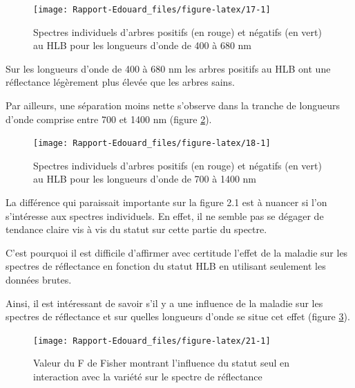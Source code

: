 \documentclass[
  11pt,
  french,
  a4paper,
  extrafontsizes,onecolumn,openright
  ]{memoir}
\begin{document}
\scriptsize

\begin{figure}

{\centering \texttt{[image: Rapport-Edouard\_files/figure-latex/17-1]} 

}

\caption{Spectres individuels d’arbres positifs (en rouge) et négatifs (en vert) au HLB pour les longueurs d'onde de 400 à 680 nm}\label{fig:17}
\end{figure}

\normalsize

Sur les longueurs d'onde de 400 à 680 nm les arbres positifs au HLB ont une réflectance légèrement plus élevée que les arbres sains.

Par ailleurs, une séparation moins nette s'observe dans la tranche de longueurs d'onde comprise entre 700 et 1400 nm (figure \ref{fig:18}).

\scriptsize

\begin{figure}

{\centering \texttt{[image: Rapport-Edouard\_files/figure-latex/18-1]} 

}

\caption{Spectres individuels d’arbres positifs (en rouge) et négatifs (en vert) au HLB pour les longueurs d’onde de 700 à 1400 nm}\label{fig:18}
\end{figure}

\normalsize

La différence qui paraissait importante sur la figure 2.1 est à nuancer si l'on s'intéresse aux spectres individuels. En effet, il ne semble pas se dégager de tendance claire vis à vis du statut sur cette partie du spectre.

C'est pourquoi il est difficile d'affirmer avec certitude l'effet de la maladie sur les spectres de réflectance en fonction du statut HLB en utilisant seulement les données brutes.

Ainsi, il est intéressant de savoir s'il y a une influence de la maladie sur les spectres de réflectance et sur quelles longueurs d'onde se situe cet effet (figure \ref{fig:21}).

\scriptsize

\begin{figure}

{\centering \texttt{[image: Rapport-Edouard\_files/figure-latex/21-1]} 

}

\caption{Valeur du F de Fisher montrant l’influence du statut seul en interaction avec la variété sur le spectre de réflectance}\label{fig:21}
\end{figure}
\end{document}

